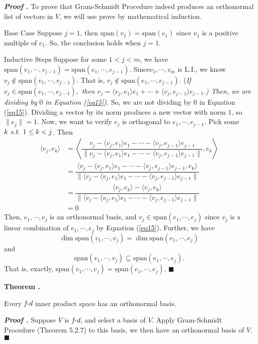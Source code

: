 \documentclass[11pt, letterpaper]{article}
\newcounter{index}[subsection]
\newenvironment*{thm}[1]{\begin{tcolorbox}\par\noindent\textbf{Theorem \thesubsection.\stepcounter{index}\theindex\ #1} \par}{\par\end{tcolorbox}}
\newcounter{nprf}[subsection]
\newenvironment*{prf}{\par\indent\textbf{\textit{Proof \stepcounter{nprf}\thenprf.}}}{\hfill$\blacksquare$\par}
\def\st{\emph{ s.t. }}
\def\LI{\mathrm{L.I.}}
\def\FD{\emph{f-d}}
\def\span{\mathrm{span}}
\begin{document}
\begin{prf}
	To prove that Gram-Schmidt Procedure indeed produces an orthonormal list of vectors in $V$, we will use prove by mathematical induction. \par
	$\boxed{\text{Base Case}}$	Suppose $j=1$, then $\span(v_1)=\span(e_1)$ since $v_1$ is a positive multiple of $e_1$. So, the conclusion holds when $j=1$. \par 
	$\boxed{\text{Inductive Steps}}$ Suppose for some $1<j<m$, we have $\span(v_1,\cdots,v_{j-1})=\span(e_1,\cdots,e_{j-1})$. Since$v_1,\cdots,v_m$ is $\LI$, we know $v_j\notin\span(v_1,\cdots,v_{j-1})$. That is, $v_j\notin\span(e_1,\cdots,e_{j-1})$. (\textit{If $v_j\in\span(e_1,\cdots,e_{j-1}),$ then $v_j=\langle v_j,e_1\rangle e_1+\cdots+\langle v_j,e_{j-1}\rangle e_{j-1}$.) Then, we are dividing by $0$ in Equation (\ref{eq15}).} So, we are not dividing by $0$ in Equation (\ref{eq15}). Dividing a vector by its norm produces a new vector with norm $1$, so $\|e_j\|=1$. Now, we want to verify $e_j$ is orthogonal to $e_1,\cdots,e_{j-1}$. Pick some $k\st 1\leq k<j$. Then \[\begin{aligned}\langle e_j,e_k\rangle &=\left\langle\dfrac{v_j-\langle v_j,e_1\rangle e_1-\cdots-\langle v_j,e_{j-1}\rangle e_{j-1}}{\|v_j-\langle v_j,e_1\rangle e_1-\cdots-\langle v_j,e_{j-1}\rangle e_{j-1}\|}, e_k\right\rangle\\&=\dfrac{\langle v_j-\langle v_j,e_1\rangle e_1-\cdots-\langle v_j,e_{j-1}\rangle e_{j-1}, e_k\rangle}{\|\langle v_j-\langle v_j,e_1\rangle e_1-\cdots-\langle v_j,e_{j-1}\rangle e_{j-1}\|}\\&=\dfrac{\langle v_j,e_k\rangle - \langle v_j,e_k\rangle}{\|\langle v_j-\langle v_j,e_1\rangle e_1-\cdots-\langle v_j,e_{j-1}\rangle e_{j-1}\|}\\&=0\end{aligned}\] Then, $e_1,\cdots,e_j$ is an orthonormal basis, and $v_j\in\span(e_1,\cdots,e_j)$ since $v_j$ is a linear combination of $e_1,\cdots,e_j$ by Equation (\ref{eq15}). Further, we have \[\dim\span(v_1,\cdots,v_j)=\dim\span(e_1,\cdots,e_j)\] and \[\span(v_1,\cdots,v_j)\subseteq\span(e_1,\cdots,e_j).\] That is, exactly, $\span(v_1,\cdots,v_j)=\span(e_1,\cdots,e_j).$
\end{prf}
\begin{thm}{}
	Every $\FD$ inner product space has an orthonormal basis.	
\end{thm}
\begin{prf}
	Suppose $V$ is $\FD$, and select a basis of $V$. Apply Gram-Schmidt Procedure (Theorem 5.2.7) to this basis, we then have an orthonormal basis of $V$.	
\end{prf}
\end{document}

